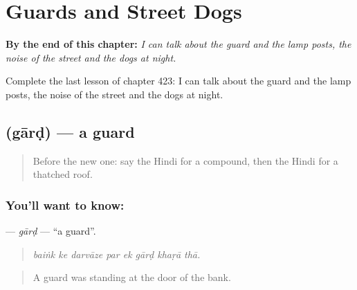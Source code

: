 
\chapter{Guards and Street Dogs}
\label{ch:hi-guards-and-street-dogs}

\begin{chapteropening}
\textbf{By the end of this chapter:} \emph{I can talk about the guard and the lamp posts, the noise of the street and the dogs at night.}

Complete the last lesson of chapter 423: I can talk about the guard and the lamp posts, the noise of the street and the dogs at night.
\end{chapteropening}

\section[\texorpdfstring{\hi{गार्ड} (gārḍ)}{गार्ड (gārḍ)}]{ (gārḍ) — a guard}

\label{lesson:HI-C423-gard}



\begin{quote}
Before the new one: say the Hindi for a compound, then the Hindi for a thatched roof.
\end{quote}

\subsection*{You'll want to know: }
\textbf{} — \emph{gārḍ} — \textquotedblleft{}a guard\textquotedblright{}.

\begin{quote}
       
\end{quote}

\begin{quote}
\emph{baiṅk ke darvāze par ek gārḍ khaṛā thā.}
\end{quote}

\begin{quote}
A guard was standing at the door of the bank.
\end{quote}

